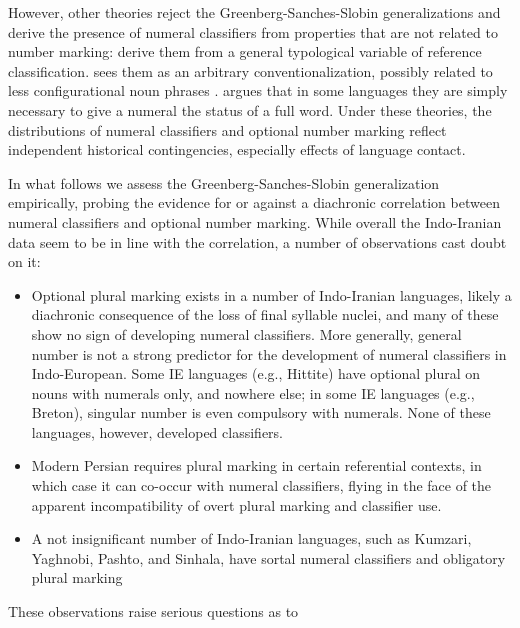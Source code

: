 \documentclass[11pt]{article}
\begin{document}
However, other theories reject the Greenberg-Sanches-Slobin generalizations and derive the presence of numeral classifiers from properties that are not related to number marking:
\citet{AikhenvaldDixon1998} derive them from a general typological variable of reference classification. 
\citet{Gil2005} sees them as an arbitrary conventionalization, possibly related to less configurational noun phrases \citep{Gil1987}. 
\citet{Lehmann2010} argues that in some languages they are simply necessary to give a numeral the status of a full word. Under these theories, the distributions of numeral classifiers and optional number marking reflect independent historical contingencies, especially effects of language contact.

In what follows we assess the Greenberg-Sanches-Slobin generalization empirically, probing the evidence for or against a diachronic correlation between 
numeral classifiers and optional number marking. While overall the Indo-Iranian data seem to be in line with the correlation, a number of observations cast doubt on it:
\begin{itemize}
\item Optional plural marking exists in a number of Indo-Iranian languages, likely a diachronic consequence of the loss of final syllable nuclei, and many of these show no sign of developing numeral classifiers. More generally, general number is not a strong predictor for the development of numeral classifiers in Indo-European. Some IE languages (e.g., Hittite) have optional plural on nouns with numerals only, and nowhere else; in some IE languages (e.g., Breton), singular number is even compulsory with numerals. None of these languages, however, developed classifiers.

\item Modern Persian requires plural marking in certain referential contexts, in which case it can co-occur with numeral classifiers, flying in the face of the apparent incompatibility of overt plural marking and classifier use.

\item %
A not insignificant number of Indo-Iranian languages, such as Kumzari, Yaghnobi, Pashto, and Sinhala, have sortal numeral classifiers and obligatory plural marking


\end{itemize}
These observations raise serious questions as to 
\end{document}
